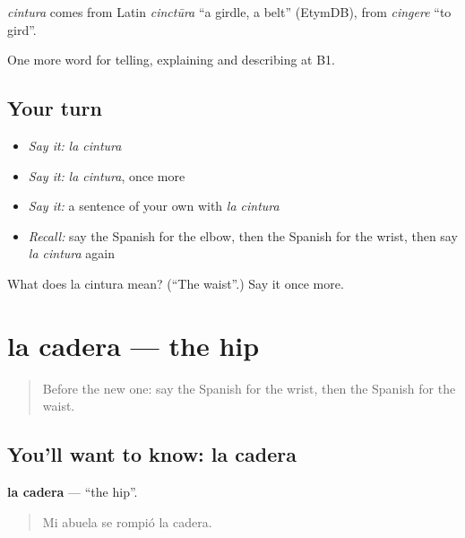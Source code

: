 \begin{cousinweb}
\emph{cintura} comes from Latin \emph{cinctūra} \textquotedblleft{}a girdle, a belt\textquotedblright{} (EtymDB), from \emph{cingere} \textquotedblleft{}to gird\textquotedblright{}.
\end{cousinweb}

\begin{grammarlens}[title={What you've built}]
One more word for telling, explaining and describing at B1.
\end{grammarlens}

\subsection*{Your turn}
\begin{itemize}
\raggedright
  \item \emph{Say it:} \emph{la cintura}
  \item \emph{Say it:} \emph{la cintura}, once more
  \item \emph{Say it:} a sentence of your own with \emph{la cintura}
  \item \emph{Recall:} say the Spanish for the elbow, then the Spanish for the wrist, then say \emph{la cintura} again
\end{itemize}

\begin{tcolorbox}[breakable,colback=teal!4,colframe=teal!35!black,title={Before you move on}]
What does la cintura mean? (\textquotedblleft{}The waist\textquotedblright{}.) Say it once more.
\end{tcolorbox}
\section[la cadera]{la cadera — the hip}

\label{lesson:ES-C737-cadera}



\begin{quote}
Before the new one: say the Spanish for the wrist, then the Spanish for the waist.
\end{quote}

\subsection*{You'll want to know: la cadera}
\textbf{la cadera} — \textquotedblleft{}the hip\textquotedblright{}.

\begin{quote}
Mi abuela se rompió la cadera.
\end{quote}

